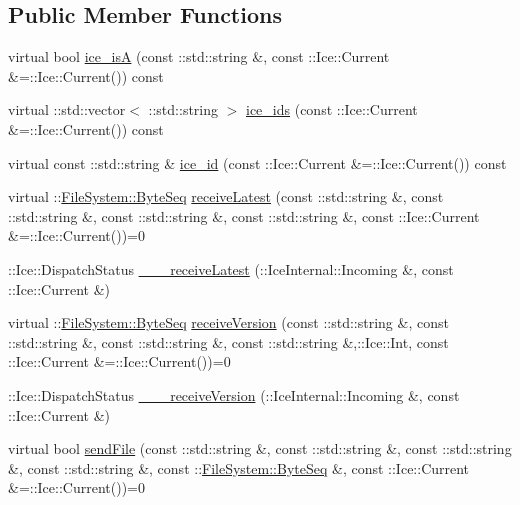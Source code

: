 \subsection*{Public Member Functions}
\begin{DoxyCompactItemize}
\item 
virtual bool \hyperlink{class_file_system_1_1_file_afec97134dcddcbbc8f71facb63fab3a1}{ice\+\_\+is\+A} (const \+::std\+::string \&, const \+::Ice\+::\+Current \&=\+::Ice\+::\+Current()) const 
\item 
virtual \+::std\+::vector$<$ \+::std\+::string $>$ \hyperlink{class_file_system_1_1_file_abab4030df236aaeaba1f11025ad8a44e}{ice\+\_\+ids} (const \+::Ice\+::\+Current \&=\+::Ice\+::\+Current()) const 
\item 
virtual const \+::std\+::string \& \hyperlink{class_file_system_1_1_file_ab914ee68ffbae6780d679fad367157aa}{ice\+\_\+id} (const \+::Ice\+::\+Current \&=\+::Ice\+::\+Current()) const 
\item 
virtual \+::\hyperlink{namespace_file_system_a5c85de065f9c451ae1d1dea2dacb68c5}{File\+System\+::\+Byte\+Seq} \hyperlink{class_file_system_1_1_file_a99b432d430b47e2f065cf9ad529c8956}{receive\+Latest} (const \+::std\+::string \&, const \+::std\+::string \&, const \+::std\+::string \&, const \+::std\+::string \&, const \+::Ice\+::\+Current \&=\+::Ice\+::\+Current())=0
\item 
\+::Ice\+::\+Dispatch\+Status \hyperlink{class_file_system_1_1_file_a26bd114faec6b1c85d119ff4a0e57ca1}{\+\_\+\+\_\+\+\_\+receive\+Latest} (\+::Ice\+Internal\+::\+Incoming \&, const \+::Ice\+::\+Current \&)
\item 
virtual \+::\hyperlink{namespace_file_system_a5c85de065f9c451ae1d1dea2dacb68c5}{File\+System\+::\+Byte\+Seq} \hyperlink{class_file_system_1_1_file_a135c7e7f7f7838e6c76c36cdf0012131}{receive\+Version} (const \+::std\+::string \&, const \+::std\+::string \&, const \+::std\+::string \&, const \+::std\+::string \&,\+::Ice\+::\+Int, const \+::Ice\+::\+Current \&=\+::Ice\+::\+Current())=0
\item 
\+::Ice\+::\+Dispatch\+Status \hyperlink{class_file_system_1_1_file_a96c6caf4d0270443e84f1fb4548e3de8}{\+\_\+\+\_\+\+\_\+receive\+Version} (\+::Ice\+Internal\+::\+Incoming \&, const \+::Ice\+::\+Current \&)
\item 
virtual bool \hyperlink{class_file_system_1_1_file_a06849361bc722ed92f0075377eac6d09}{send\+File} (const \+::std\+::string \&, const \+::std\+::string \&, const \+::std\+::string \&, const \+::std\+::string \&, const \+::\hyperlink{namespace_file_system_a5c85de065f9c451ae1d1dea2dacb68c5}{File\+System\+::\+Byte\+Seq} \&, const \+::Ice\+::\+Current \&=\+::Ice\+::\+Current())=0

\end{DoxyCompactItemize}
